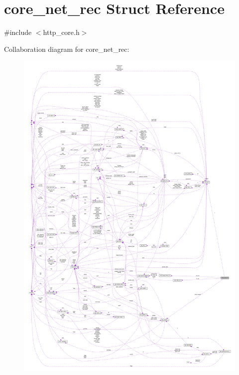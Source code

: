 \hypertarget{structcore__net__rec}{}\section{core\+\_\+net\+\_\+rec Struct Reference}
\label{structcore__net__rec}


{\ttfamily \#include $<$http\+\_\+core.\+h$>$}



Collaboration diagram for core\+\_\+net\+\_\+rec\+:
\nopagebreak
\begin{figure}[H]
\begin{center}
\leavevmode
\includegraphics[width=350pt]{structcore__net__rec__coll__graph}
\end{center}
\end{figure}
